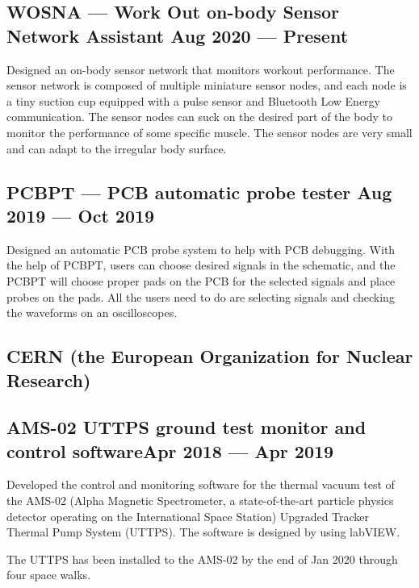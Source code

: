 \documentclass[letter,10pt]{article}
\begin{document}
\subsection{{WOSNA --- Work Out on-body Sensor Network Assistant \hfill Aug 2020 --- Present}}
\begin{zitemize}
\item Designed an on-body sensor network that monitors workout performance. The sensor network is composed of multiple miniature sensor nodes, and each node is a tiny suction cup equipped with a pulse sensor and Bluetooth Low Energy communication. The sensor nodes can suck on the desired part of the body to monitor the performance of some specific muscle. The sensor nodes are very small and can adapt to the irregular body surface.
\end{zitemize}

\subsection{{PCBPT --- PCB automatic probe tester \hfill Aug 2019 --- Oct 2019}}
\begin{zitemize}
\item Designed an automatic PCB probe system to help with PCB debugging.
With the help of PCBPT, users can choose desired signals in the schematic,
and the PCBPT will choose proper pads on the PCB for the selected signals
and place probes on the pads. All the users need to do are selecting signals
and checking the waveforms on an oscilloscopes.
\end{zitemize}

\subsection{CERN (the European Organization for Nuclear Research)}
\subsection{{AMS-02 UTTPS ground test monitor and control software\hfill Apr 2018 --- Apr 2019}}
\begin{zitemize}
\item Developed the control and monitoring software for the thermal vacuum test of the AMS-02 (Alpha Magnetic Spectrometer, a state-of-the-art particle physics detector operating on the International Space Station) Upgraded Tracker Thermal Pump System (UTTPS). The software is designed by using labVIEW.
\item The UTTPS has been installed to the AMS-02 by the end of Jan 2020 through four space walks.
\end{zitemize}
\end{document}
